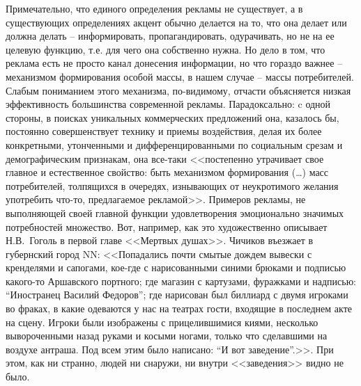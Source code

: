 Примечательно, что единого определения рекламы не существует, а в существующих
определениях акцент обычно делается на то, что она делает или должна делать --
информировать, пропагандировать, одурачивать, но не на ее целевую функцию, т.е.
для чего она собственно нужна. Но дело в том, что реклама есть не просто канал
донесения информации, но что гораздо важнее -- механизмом формирования особой массы,
в нашем случае -- массы потребителей. Слабым пониманием этого механизма, по-видимому,
отчасти объясняется низкая эффективность большинства современной рекламы.
Парадоксально: c одной стороны, в поисках уникальных коммерческих предложений
она, казалось бы, постоянно совершенствует технику и приемы воздействия,
делая их более конкретными, утонченными и дифференцированными по социальным
срезам и демографическим признакам, она все-таки <<постепенно утрачивает свое
главное и естественное свойство: быть механизмом формирования (\ldots) масс
потребителей, толпящихся в очередях, изнывающих от неукротимого желания
употребить что-то, предлагаемое рекламой>>\autocite[][312]{olshansky}. Примеров
рекламы, не выполняющей своей главной функции удовлетворения эмоционально
значимых потребностей множество. Вот, например, как это художественно описывает
Н.В.~Гоголь в первой главе <<Мертвых душах>>. Чичиков въезжает в губернский город NN:
<<Попадались почти смытые дождем вывески с кренделями и сапогами, кое-где с
нарисованными синими брюками и подписью какого-то Аршавского портного;
где магазин с картузами, фуражками и надписью: ``Иностранец Василий Федоров'';
где нарисован был биллиард с двумя игроками во фраках, в какие одеваются
у нас на театрах гости, входящие в последнем акте на сцену.
Игроки были изображены с прицелившимися киями, несколько вывороченными
назад руками и косыми ногами, только что сделавшими на воздухе антраша.
Под всем этим было написано: ``И вот заведение''.>>\autocite{gogol2006}.
При этом, как ни странно, людей ни снаружи, ни внутри <<заведения>> видно не было.


